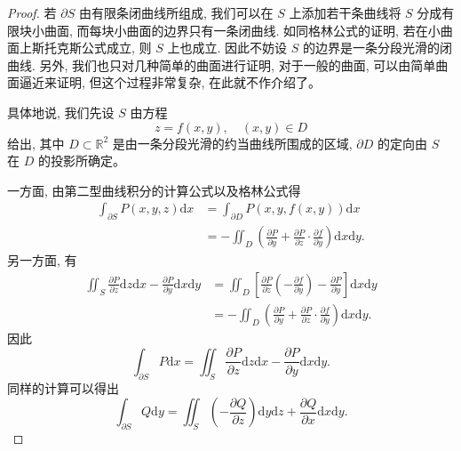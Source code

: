 \documentclass[UTF8,12pt,a4paper,fontset=fandol]{ctexart}
\begin{document}
\begin{proof}\quad 若 $\partial S$ 由有限条闭曲线所组成, 我们可以在 $S$ 上添加若干条曲线将 $S$ 分成有限块小曲面, 而每块小曲面的边界只有一条闭曲线. 如同格林公式的证明, 若在小曲面上斯托克斯公式成立, 则 $S$ 上也成立. 因此不妨设 $S$ 的边界是一条分段光滑的闭曲线. 另外, 我们也只对几种简单的曲面进行证明, 对于一般的曲面, 可以由简单曲面逼近来证明, 但这个过程非常复杂, 在此就不作介绍了。

具体地说, 我们先设 $S$ 由方程
\begin{equation}
  z=f(x,y),\quad (x,y)\in D
  \label{course-eq-16-5-1}
\end{equation}
给出, 其中 $D\subset\mathbb R^2$ 是由一条分段光滑的约当曲线所围成的区域, $\partial D$ 的定向由 $S$ 在 $D$ 的投影所确定。

一方面, 由第二型曲线积分的计算公式以及格林公式得
\[
\begin{aligned}
  \int_{\partial S}P(x,y,z)\mathrm dx
  &=\int_{\partial D}P(x,y,f(x,y))\mathrm dx\\
  &=-\iint_D\left(\frac{\partial P}{\partial y}
    +\frac{\partial P}{\partial z}\cdot\frac{\partial f}{\partial y}\right)\mathrm dx\mathrm dy.
\end{aligned}
\]
另一方面, 有
\[
\begin{aligned}
  \iint_S\frac{\partial P}{\partial z}\mathrm dz\mathrm dx
  -\frac{\partial P}{\partial y}\mathrm dx\mathrm dy
  &=\iint_D\left[\frac{\partial P}{\partial z}\left(-\frac{\partial f}{\partial y}\right)
    -\frac{\partial P}{\partial y}\right]\mathrm dx\mathrm dy\\
  &=-\iint_D\left(\frac{\partial P}{\partial y}
    +\frac{\partial P}{\partial z}\cdot\frac{\partial f}{\partial y}\right)\mathrm dx\mathrm dy.
\end{aligned}
\]
因此
\[
  \int_{\partial S}P\mathrm dx
  =\iint_S\frac{\partial P}{\partial z}\mathrm dz\mathrm dx
    -\frac{\partial P}{\partial y}\mathrm dx\mathrm dy.
\]
同样的计算可以得出
\[
  \int_{\partial S}Q\mathrm dy
  =\iint_S\left(-\frac{\partial Q}{\partial z}\right)\mathrm dy\mathrm dz
    +\frac{\partial Q}{\partial x}\mathrm dx\mathrm dy.
\]


\end{proof}
\end{document}
